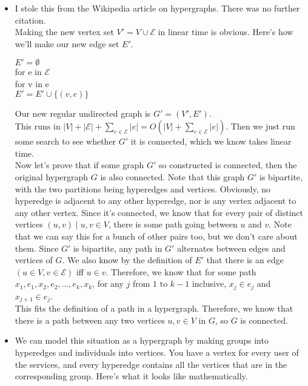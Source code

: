 \documentclass[11pt]{article}
\begin{document}
\begin{solution}
    \begin{itemize}
        \item I stole this from the Wikipedia article on hypergraphs. There was no further citation. 
            \\ Making the new vertex set $V' = V \cup \mathcal{E}$ in linear time is obvious. Here's how we'll make our new edge set $E'$.
            \begin{algo}
                $E' = \emptyset$
                \\ for e in $\mathcal{E}$ \+
                \\ for v in e \+
                \\ $E' = E' \cup \{(v, e)\}$ 
            \end{algo}
            Our new regular undirected graph is $G' = (V', E')$.
            \\ This runs in $|V| + |\mathcal{E}| + \sum_{e \in \mathcal{E}} |e| = O(|V| +\sum_{e \in \mathcal{E}}|e|)$. Then we just run some search to see whether $G'$ it is connected, which we know takes linear time.
            \\ Now let's prove that if some graph $G'$ so constructed is connected, then the original hypergraph $G$ is also connected. Note that this graph $G'$ is bipartite, with the two partitions being hyperedges and vertices. Obviously, no hyperedge is adjacent to any other hyperedge, nor is any vertex adjacent to any other vertex. Since it's connected, we know that for every pair of distinct vertices $(u, v) \mid u, v \in V$, there is some path going between $u$ and $v$. Note that we can say this for a bunch of other pairs too, but we don't care about them. Since $G'$ is bipartite, any path in $G'$ alternates between edges and vertices of $G$. We also know by the definition of $E'$ that there is an edge $(u \in V, v \in \mathcal{E})$ iff $u \in v$. Therefore, we know that for some path $x_1, e_1, x_2, e_2,\ldots, e_k, x_k$, for any $j$ from $1$ to $k - 1$ inclusive, $x_j \in e_j$ and $x_{j+1} \in e_j$.
            \\ This fits the definition of a path in a hypergraph. Therefore, we know that there is a path between any two vertices $u, v \in V$ in $G$, so $G$ is connected.
        \item We can model this situation as a hypergraph by making groups into hyperedges and individuals into vertices. You have a vertex for every user of the services, and every hyperedge contains all the vertices that are in the corresponding group. Here's what it looks like mathematically. 

\end{itemize}
\end{solution}
\end{document}
